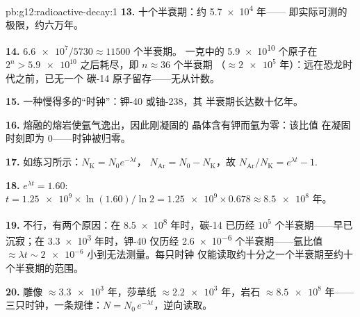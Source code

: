 \begin{solution}{pb:g12:radioactive-decay:1}
\textbf{13.} 十个半衰期：约 \num{5.7e4} 年——
即实际可测的极限，约六万年。

\textbf{14.} $\num{6.6e7}/\num{5730} \approx \num{11500}$ 个半衰期。
一克中的 \num{5.9e10} 个原子在
$2^n > \num{5.9e10}$ 之后耗尽，即 $n \approx 36$ 个半衰期
（$\approx \num{2e5}$ 年）：远在恐龙时代之前，已无一个
碳-14 原子留存——无从计数。

\textbf{15.} 一种慢得多的“时钟”：钾-40 或铀-238，其
半衰期长达数十亿年。

\textbf{16.} 熔融的熔岩使氩气逸出，因此刚凝固的
晶体含有钾而氩为零：该比值
在凝固时刻即为 $0$——时钟被归零。

\textbf{17.} 如练习所示：$N_{\mathrm K} = N_0 e^{-\lambda t}$，
$N_{\mathrm{Ar}} = N_0 - N_{\mathrm K}$，故
$N_{\mathrm{Ar}}/N_{\mathrm K} = e^{\lambda t} - 1$.

\textbf{18.} $e^{\lambda t} = 1.60$:
$t = \num{1.25e9} \times \ln(1.60)/\ln 2 = \num{1.25e9} \times 0.678
\approx \num{8.5e8}$ 年。

\textbf{19.} 不行，有两个原因：在 \num{8.5e8} 年时，碳-14 已历经
$10^5$ 个半衰期——早已沉寂；在 \num{3.3e3} 年时，钾-40 仅历经
\num{2.6e-6} 个半衰期——氩比值
$\approx \lambda t \sim \num{2e-6}$ 小到无法测量。每只时钟
仅能读取约十分之一个半衰期至约十个半衰期的范围。

\textbf{20.} 雕像 $\approx \num{3.3e3}$ 年，莎草纸
$\approx \num{2.2e3}$ 年，岩石 $\approx \num{8.5e8}$ 年——
三只时钟，一条规律：$N = N_0\,e^{-\lambda t}$，逆向读取。
\end{solution}
